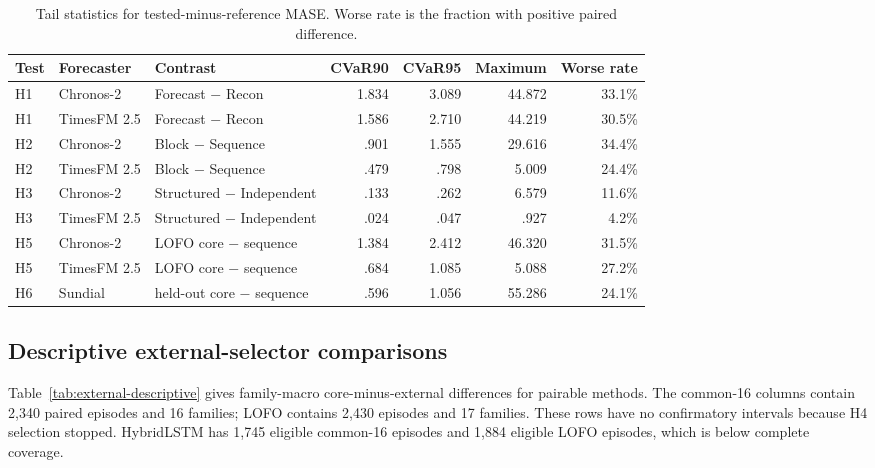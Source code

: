 \begin{table}[h]
\caption{Tail statistics for tested-minus-reference MASE. Worse rate is the fraction with positive paired difference.}
\label{tab:component-tail}
\centering
\scriptsize
\setlength{\tabcolsep}{3.2pt}
\begin{tabular}{lllrrrr}
\toprule
Test & Forecaster & Contrast & CVaR90 & CVaR95 & Maximum & Worse rate \\
\midrule
H1 & Chronos-2 & Forecast $-$ Recon & 1.834 & 3.089 & 44.872 & 33.1\% \\
H1 & TimesFM 2.5 & Forecast $-$ Recon & 1.586 & 2.710 & 44.219 & 30.5\% \\
H2 & Chronos-2 & Block $-$ Sequence & .901 & 1.555 & 29.616 & 34.4\% \\
H2 & TimesFM 2.5 & Block $-$ Sequence & .479 & .798 & 5.009 & 24.4\% \\
H3 & Chronos-2 & Structured $-$ Independent & .133 & .262 & 6.579 & 11.6\% \\
H3 & TimesFM 2.5 & Structured $-$ Independent & .024 & .047 & .927 & 4.2\% \\
H5 & Chronos-2 & LOFO core $-$ sequence & 1.384 & 2.412 & 46.320 & 31.5\% \\
H5 & TimesFM 2.5 & LOFO core $-$ sequence & .684 & 1.085 & 5.088 & 27.2\% \\
H6 & Sundial & held-out core $-$ sequence & .596 & 1.056 & 55.286 & 24.1\% \\
\bottomrule
\end{tabular}
\end{table}

\subsection{Descriptive external-selector comparisons}

Table~\ref{tab:external-descriptive} gives family-macro core-minus-external differences for pairable methods. The common-16 columns contain 2,340 paired episodes and 16 families; LOFO contains 2,430 episodes and 17 families. These rows have no confirmatory intervals because H4 selection stopped. HybridLSTM has 1,745 eligible common-16 episodes and 1,884 eligible LOFO episodes, which is below complete coverage.

